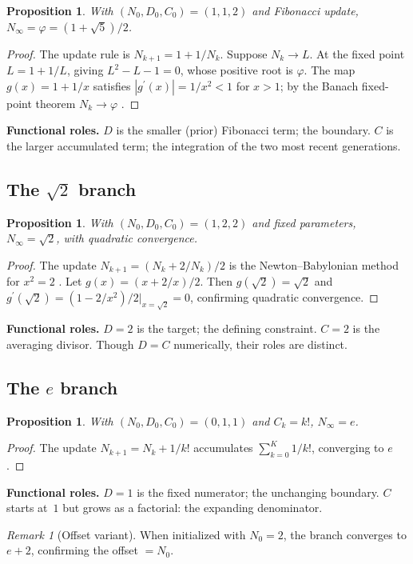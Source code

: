 \documentclass[12pt]{article}
\newtheorem{proposition}[theorem]{Proposition}
\theoremstyle{definition}
\theoremstyle{remark}
\newtheorem{remark}[theorem]{Remark}
\begin{document}
\begin{proposition}\label{prop:phi}
With $(N_0, D_0, C_0) = (1, 1, 2)$ and Fibonacci update, $N_\infty = \varphi = (1+\sqrt{5})/2$.
\end{proposition}
\begin{proof}
The update rule is $N_{k+1} = 1 + 1/N_k$. Suppose $N_k \to L$. At the fixed point
$L = 1 + 1/L$, giving $L^2 - L - 1 = 0$, whose positive root is $\varphi$. The map
$g(x) = 1 + 1/x$ satisfies $|g^{\prime}(x)| = 1/x^2 < 1$ for $x > 1$; by the Banach
fixed-point theorem $N_k \to \varphi$ \cite{HW79,Kos01}.
\end{proof}
\textbf{Functional roles.} $D$ is the smaller (prior) Fibonacci term; the boundary.
$C$ is the larger accumulated term; the integration of the two most recent generations.

\subsection{The \texorpdfstring{$\sqrt{2}$}{sqrt(2)} branch}\label{subsec:sqrt2}

\begin{proposition}\label{prop:sqrt2}
With $(N_0, D_0, C_0) = (1, 2, 2)$ and fixed parameters, $N_\infty = \sqrt{2}$, with quadratic convergence.
\end{proposition}
\begin{proof}
The update $N_{k+1} = (N_k + 2/N_k)/2$ is the Newton--Babylonian method for $x^2 = 2$
\cite{Hea21,BF15}. Let $g(x) = (x + 2/x)/2$. Then $g(\sqrt{2}) = \sqrt{2}$ and
$g^{\prime}(\sqrt{2}) = (1 - 2/x^2)/2\big|_{x=\sqrt{2}} = 0$, confirming quadratic convergence.
\end{proof}
\textbf{Functional roles.} $D = 2$ is the target; the defining constraint. $C = 2$ is the
averaging divisor. Though $D = C$ numerically, their roles are distinct.

\subsection{The \texorpdfstring{$e$}{e} branch}\label{subsec:e}

\begin{proposition}\label{prop:e}
With $(N_0, D_0, C_0) = (0, 1, 1)$ and $C_k = k!$, $N_\infty = e$.
\end{proposition}
\begin{proof}
The update $N_{k+1} = N_k + 1/k!$ accumulates $\sum_{k=0}^{K} 1/k!$, converging to $e$ \cite{Rud76}.
\end{proof}
\textbf{Functional roles.} $D = 1$ is the fixed numerator; the unchanging boundary.
$C$ starts at~$1$ but grows as a factorial: the expanding denominator.
\begin{remark}[Offset variant]
When initialized with $N_0 = 2$, the branch converges to $e + 2$, confirming the offset $= N_0$.
\end{remark}
\end{document}
